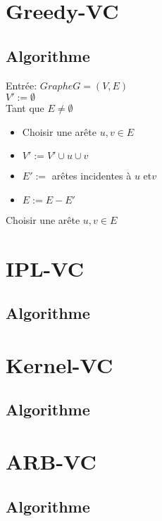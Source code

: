 \documentclass[a4paper, 12pt]{article}
\author{Thibault \bsc{BEZIERS LA FOSSE}}
\date{}
\begin{document}
\tableofcontents
\section{Greedy-VC}
\subsection{Algorithme}

\noindent Entrée: $Graphe G = (V, E)$ \\
$V' := \emptyset $\\
Tant que $E \neq \emptyset$ \\
\begin{itemize}
\item Choisir une arête ${u, v} \in E$ \\
\item $V' := V' \cup {u} \cup {v}$ \\
\item $E' :=$ arêtes incidentes à $u$ et$ v$ \\
\item $E := E - E'$ \\
\end{itemize}
Choisir une arête ${u, v} \in E$ \\



\section{IPL-VC}
\subsection{Algorithme}

\section{Kernel-VC}
\subsection{Algorithme}

\section{ARB-VC}
\subsection{Algorithme}
\end{document}
